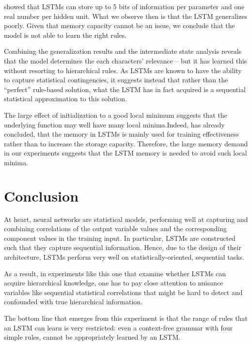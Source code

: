 \documentclass[11pt,a4paper]{article}
\begin{document}
\citeauthor{collins2016capacity}  showed that LSTMs can store up to 5 bits of information per parameter and one real number per hidden unit. 
What we observe then is that the LSTM generalizes poorly. Given that memory capacity cannot be an issue, we conclude that the model is not able to learn the right rules.

Combining the generalization results and the intermediate state analysis reveals that the model determines the each characters' relevance -- but it has learned this without resorting to hierarchical rules. As LSTMs are known to have the ability to capture statistical contingencies, it suggests instead that rather than the ``perfect'' rule-based solution, what the LSTM has in fact acquired is a sequential statistical approximation to this solution.

The large effect of initialization to a good local minimum suggests that the underlying function may well have many local minima.Indeed, \citeauthor{collins2016capacity}  has already concluded, that the memory in LSTMs is mainly used for training effectiveness rather than to increase the storage capacity. Therefore, the large memory demand in our experiments suggests that the LSTM memory is needed to avoid such local minima.

\section{Conclusion}

At heart, neural networks are statistical models, performing well at capturing and combining correlations of the output variable values and the corresponding component values in the training input. In particular, LSTMs are constructed such that they capture sequential information. Hence, due to the design of their architecture, LSTMs perform very well on statistically-oriented, sequential tasks. 

As a result, in experiments like this one that examine whether LSTMs can acquire hierarchical knowledge, one has to pay close attention to nuisance variables like sequential statistical correlations that might be hard to detect and confounded with true hierarchical information.

The bottom line that emerges from this experiment is that the range of rules that an LSTM can learn is very restricted: even a context-free grammar with four simple rules, cannot be appropriately learned by an LSTM. 
\end{document}
